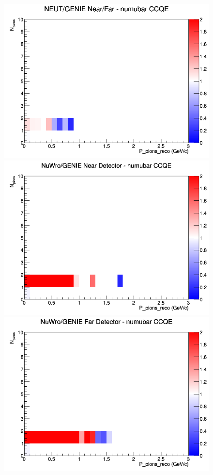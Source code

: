 \documentclass[12pt]{article}
\begin{document}
\begin{figure}[h]
\endminipage
{}
\includegraphics[width=\linewidth]{eff_N_P/LAr/pions/ratios/CCQE_NEUT_GENIE_numubar_NF_N_P.png}
\endminipage
\newline
{}
\includegraphics[width=\linewidth]{eff_N_P/LAr/pions/ratios/CCQE_NuWro_GENIE_numubar_near_N_P.png}
\endminipage
{}
\includegraphics[width=\linewidth]{eff_N_P/LAr/pions/ratios/CCQE_NuWro_GENIE_numubar_far_N_P.png}

\end{figure}
\end{document}
